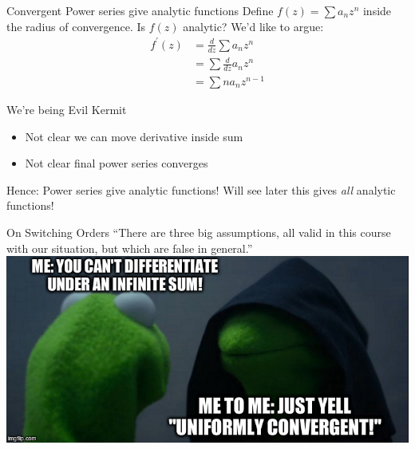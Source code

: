 \documentclass{beamer}
\begin{document}
\begin{frame}{Convergent Power series give analytic functions}
Define $f(z)=\sum a_nz^n$ inside the radius of convergence.  Is $f(z)$ analytic?  We'd like to argue:
\begin{align*}f^\prime(z)&=\frac{d}{dz}\sum a_nz^n \\
&=\sum \frac{d}{dz} a_nz^n \\
&=\sum na_nz^{n-1}
\end{align*}
\begin{block}{We're being Evil Kermit}
\begin{itemize}
    \item Not clear we can move derivative inside sum
    \item Not clear final power series converges
\end{itemize}
\end{block}
\begin{block}{Hence: Power series give analytic functions!}
Will see later this gives \emph{all} analytic functions!
\end{block}
\end{frame}

\begin{frame}{On Switching Orders}
``There are three big assumptions, all valid in this course with our situation, but which are false in general.''
\includegraphics[width=\textwidth,height=0.8\textheight,keepaspectratio]{UniformKermit.jpg}
\end{frame}
\end{document}
